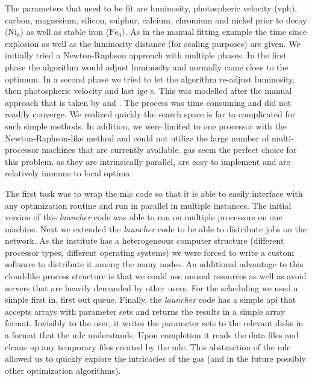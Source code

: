 The parameters that need to be fit are luminosity, photospheric velocity (\gls{vph}), carbon, magnesium, silicon, sulphur, calcium, chromium and nickel prior to decay ($\textrm{Ni}_0$) as well as stable iron ($\textrm{Fe}_0$). As in the manual fitting example the time since explosion as well as the luminosity distance (for scaling purposes) are given. We initially tried a Newton-Raphson approach with multiple phases. In the first phase the algorithm would adjust luminosity and normally came close to the optimum. In a second phase we tried to let the algorithm re-adjust luminosity, then photospheric velocity and last \gls{ige} s. This was modelled after the manual approach that is taken by \citet{hachinger_dipl2007} and \citep{hachinger_phd2011}. The process was time consuming and did not readily converge. We realized quickly the search space is far to complicated for such simple methods. In addition, we were limited to one processor with the Newton-Raphson-like method and could not utilize the large number of multi-processor machines that are currently available. \glspl{ga} seem the perfect choice for this problem, as they are intrinsically parallel, are easy to implement and are relatively immune to local optima.

The first task was to wrap the \gls{mlc} code so that it is able to easily interface with any optimization routine and run in parallel in multiple instances. The initial version of this \emph{launcher} code was able to run on multiple processors on one machine. Next we extended the \emph{launcher} code to be able to distribute jobs on the network. As the institute has a heterogeneous computer structure (different processor types, different operating systems) we were forced to write a custom software to distribute it among the many nodes. An additional advantage to this cloud-like process structure is that we could use unused resources as well as avoid servers that are heavily demanded by other users. For the scheduling we used a simple first in, first out queue. Finally, the \emph{launcher} code has a simple \gls{api} that accepts arrays with parameter sets and returns the results in a simple array format. Invisibly to the user, it writes the parameter sets to the relevant disks in a format that the \gls{mlc} understands. Upon completion it reads the data files and cleans up any temporary files created by the \gls{mlc}. This abstraction of the \gls{mlc} allowed us to quickly explore the intricacies of the \glspl{ga} (and in the future possibly other optimization algorithms).


